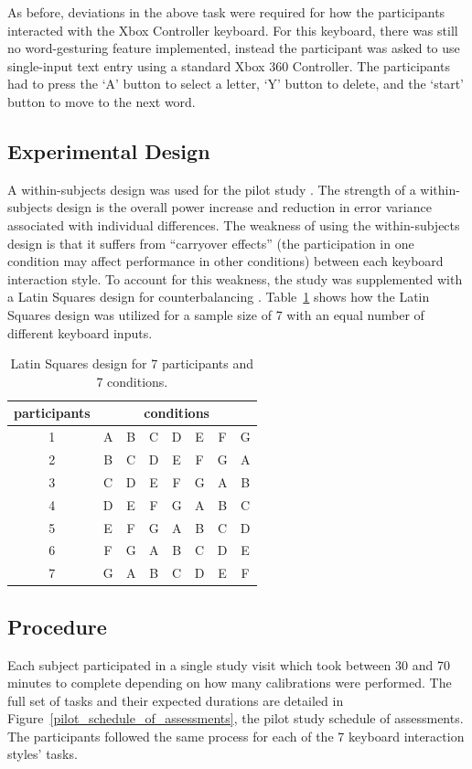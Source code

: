 As before, deviations in the above task were required for how the participants interacted with the Xbox Controller keyboard. For this keyboard, there was still no word-gesturing feature implemented, instead the participant was asked to use single-input text entry using a standard Xbox 360 Controller. The participants had to press the `A' button to select a letter, `Y' button to delete, and the `start' button to move to the next word.

\subsection{Experimental Design} \label{pilot_experimental_design}
A within-subjects design was used for the pilot study \cite{ref_within_subjects}. The strength of a within-subjects design is the overall power increase and reduction in error variance associated with individual differences. The weakness of using the within-subjects design is that it suffers from ``carryover effects'' (the participation in one condition may affect performance in other conditions) between each keyboard interaction style. To account for this weakness, the study was supplemented with a Latin Squares design for counterbalancing \cite{ref_latin_squares}. Table~\ref{pilot_latin_squares} shows how the Latin Squares design was utilized for a sample size of 7 with an equal number of different keyboard inputs.
			
\begin{table}[!b] %
	\centering
	\caption[Latin Squares Example]{\centering Latin Squares design for 7 participants and 7 conditions.}
	\label{pilot_latin_squares}
	\begin{tabular}{c | c c c c c c c}
		\hline
		participants & \multicolumn{7}{c}{conditions} \\
		\hline
		1 & A & B & C & D & E & F & G \\
		2 & B & C & D & E & F & G & A \\
		3 & C & D & E & F & G & A & B \\
		4 & D & E & F & G & A & B & C \\
		5 & E & F & G & A & B & C & D \\
		6 & F & G & A & B & C & D & E \\
		7 & G & A & B & C & D & E & F \\
		\hline
	\end{tabular}
\end{table}

\subsection{Procedure} \label{pilot_procedure}
Each subject participated in a single study visit which took between 30 and 70 minutes to complete depending on how many calibrations were performed. The full set of tasks and their expected durations are detailed in Figure~\ref{pilot_schedule_of_assessments}, the pilot study schedule of assessments. The participants followed the same process for each of the 7 keyboard interaction styles' tasks.


